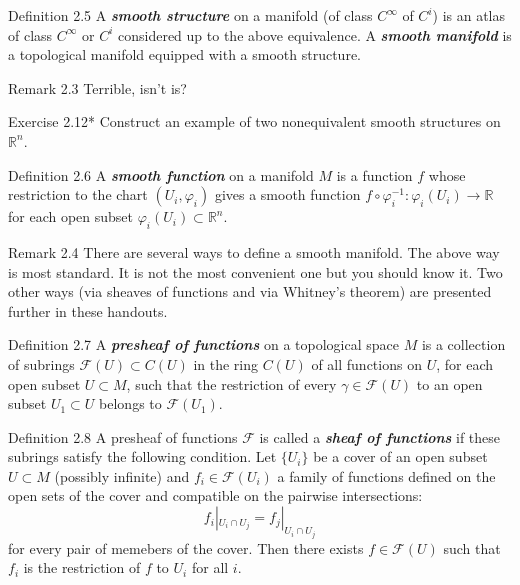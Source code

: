 \begin{thing3}{Definition 2.5}\leavevmode
	A \textit{\textbf{smooth structure}} on a manifold (of class $C^\infty$ of $C^i$) is an atlas of class $C^\infty$ or $C^i$ considered up to the above equivalence. A \textit{\textbf{smooth manifold}} is a topological manifold equipped with a smooth structure.
\end{thing3}

\begin{thing5}{Remark 2.3}\leavevmode
	Terrible, isn't is?
\end{thing5}

\begin{thing4}{Exercise 2.12*}\label{exer:2.12}\leavevmode
Construct an example of two nonequivalent smooth structures on $\mathbb{R}^n$.
\end{thing4}

\begin{thing3}{Definition 2.6}\leavevmode
	A \textit{\textbf{smooth function}} on a manifold $M$ is a function $f$ whose restriction to the chart $(U_i,\varphi_i)$ gives a smooth function $f \circ \varphi_i^{-1}:\varphi_i(U_i)\to\mathbb{R}$ for each open subset $\varphi_i(U_i) \subset \mathbb{R}^n$.
\end{thing3}

\begin{thing5}{Remark 2.4}\leavevmode
	There are several ways to define a smooth manifold. The above way is most standard. It is not the most convenient one but you should know it. Two other ways (via sheaves of functions and via Whitney's theorem) are presented further in these handouts.
\end{thing5}

\begin{thing3}{Definition 2.7}\leavevmode
	A \textit{\textbf{presheaf of functions}} on a topological space $M$ is a collection of subrings $\mathcal{F}(U) \subset C(U)$ in the ring $C(U)$ of all functions on $U$, for each open subset $U \subset M$, such that the restriction of every $\gamma \in \mathcal{F}(U)$ to an open subset $U_1 \subset U$ belongs to $\mathcal{F}(U_1)$.
\end{thing3}

\begin{thing3}{Definition 2.8}\leavevmode
	A presheaf of functions $\mathcal{F}$ is called a \textit{\textbf{sheaf of functions}} if these subrings satisfy the following condition. Let $\{U_i\}$ be a cover of an open subset $U\subset M$ (possibly infinite) and $f_i \in \mathcal{F}(U_i)$ a family of functions defined on the open sets of the cover and compatible on the pairwise intersections:
	\[f_i|_{U_i\cap U_j}=f_j|_{U_i \cap U_j}\]
	for every pair of memebers of the cover. Then there exists $f \in \mathcal{F}(U)$ such that $f_i$ is the restriction of $f$ to $U_i$ for all $i$.
\end{thing3}

